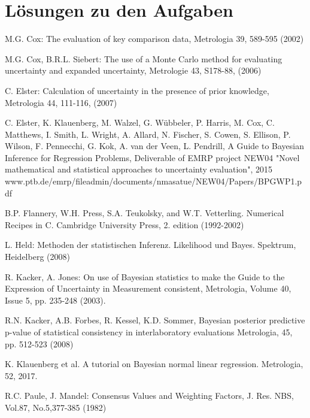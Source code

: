 \documentclass[a4paper,11pt]{book}
\begin{document}
\chapter{Lösungen zu den Aufgaben}



\begin{flushleft}
\begin{thebibliography}{------}
     M.G. Cox: The evaluation of key comparison data, Metrologia 39, 589-595 (2002)

     M.G. Cox, B.R.L. Siebert: The use of
    a Monte Carlo method for evaluating uncertainty and expanded uncertainty, Metrologie 43, S178-88, (2006)

     C. Elster: Calculation of uncertainty in the presence of prior knowledge, Metrologia 44, 111-116, (2007)

     C. Elster, K. Klauenberg, M. Walzel, G. Wübbeler, P. Harris, M. Cox, C. Matthews, I. Smith, L. Wright, A. Allard, N. Fischer, S. Cowen, S. Ellison,
    P. Wilson, F. Pennecchi, G. Kok, A. van der Veen, L. Pendrill,
    A Guide to Bayesian Inference for Regression Problems, Deliverable of EMRP project NEW04 "Novel mathematical and statistical approaches to uncertainty evaluation", 2015 \newline
    www.ptb.de/emrp/fileadmin/documents/nmasatue/NEW04/Papers/BPGWP1.pdf

     B.P. Flannery, W.H. Press, S.A. Teukolsky, and W.T. Vetterling. Numerical Recipes in C. Cambridge University Press, 2. edition (1992-2002)

     L. Held: Methoden der statistischen Inferenz. Likelihood und Bayes. Spektrum, Heidelberg (2008)

     R. Kacker, A. Jones: On use of Bayesian statistics to make the Guide to the Expression of Uncertainty in Measurement consistent, Metrologia, Volume 40, Issue 5, pp. 235-248 (2003).

     R.N. Kacker, A.B. Forbes, R. Kessel, K.D. Sommer, Bayesian posterior predictive
    p-value of statistical consistency in interlaboratory evaluations Metrologia, 45, pp. 512-523 (2008)

     K. Klauenberg et al. A tutorial on Bayesian normal linear regression. Metrologia, 52, 2017.

      R.C. Paule, J. Mandel: Consensus Values and Weighting Factors, J. Res. NBS, Vol.87, No.5,377-385 (1982)


\end{thebibliography}
\end{flushleft}
\end{document}
